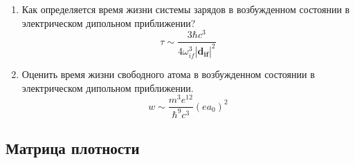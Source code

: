 \documentclass{article}
\begin{document}
\begin{enumerate}
	\item {Как определяется время жизни системы зарядов в возбужденном состоянии в электрическом дипольном приближении?}
	\begin{equation}
		\tau\sim\frac{3\hbar c^{3}}{4\omega_{if}^{3}|\boldsymbol{d_{if}}|^{2}}
	\end{equation}
	
	\item {Оценить время жизни свободного атома в возбужденном состоянии в электрическом дипольном приближении.}
	\begin{equation}
		w\sim\frac{m^{3}e^{12}}{\hbar^{9}c^{3}}(ea_{0})^{2}
	\end{equation}
\end{enumerate}

\subsection*{Матрица плотности}
\end{document}
